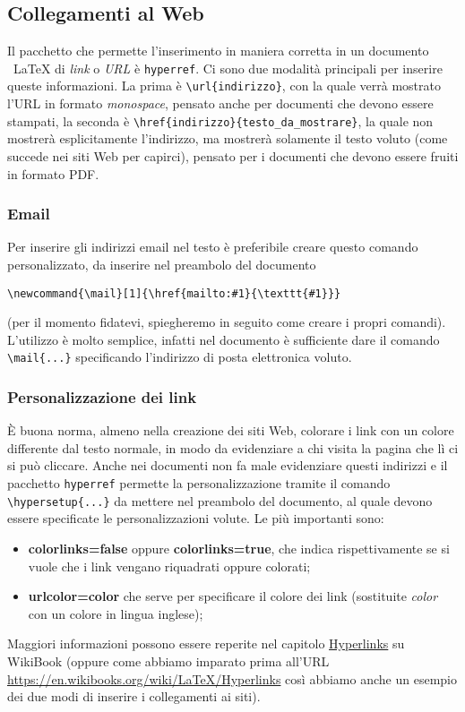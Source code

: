 \subsection{Collegamenti al Web}
Il pacchetto che permette l'inserimento in maniera corretta in un documento \
LaTeX{} di \textit{link} o \textit{URL} è \verb!hyperref!. Ci sono due 
modalità principali per inserire queste informazioni. La prima è 
\verb!\url{indirizzo}!, con la quale verrà mostrato l'URL in formato \textit{
monospace}, pensato anche per documenti che devono essere stampati, la seconda 
è \verb!\href{indirizzo}{testo_da_mostrare}!, la quale non mostrerà 
esplicitamente l'indirizzo, ma mostrerà solamente il testo voluto (come 
succede nei siti Web per capirci), pensato per i documenti che devono 
essere fruiti in formato PDF. 

\subsubsection{Email}\label{subsec:email}
Per inserire gli indirizzi email nel testo è preferibile creare questo comando 
personalizzato, da inserire nel preambolo del documento
\begin{lstlisting}
\newcommand{\mail}[1]{\href{mailto:#1}{\texttt{#1}}}
\end{lstlisting}
(per il momento fidatevi, spiegheremo in seguito come creare i propri 
comandi). L'utilizzo è molto semplice, infatti nel documento è sufficiente 
dare il comando \verb!\mail{...}! specificando l'indirizzo di posta 
elettronica voluto.

\subsubsection{Personalizzazione dei link}
È buona norma, almeno nella creazione dei siti Web, colorare i link con un 
colore differente dal testo normale, in modo da evidenziare a chi visita la 
pagina che lì ci si può cliccare. Anche nei documenti non fa male evidenziare 
questi indirizzi e il pacchetto \verb!hyperref! permette la personalizzazione 
tramite il comando \verb!\hypersetup{...}! da mettere nel preambolo del 
documento, al quale devono essere specificate le personalizzazioni volute. Le 
più importanti sono:
\begin{itemize}
    \item \textbf{colorlinks=false} oppure \textbf{colorlinks=true}, che 
    indica rispettivamente se si vuole che i link vengano riquadrati oppure 
    colorati;
    \item \textbf{urlcolor=color} che serve per specificare il colore dei link 
    (sostituite \textit{color} con un colore in lingua inglese);
\end{itemize}
Maggiori informazioni possono essere reperite nel capitolo 
\href{https://en.wikibooks.org/wiki/LaTeX/Hyperlinks}{Hyperlinks} su WikiBook 
(oppure come abbiamo imparato prima all'URL 
\url{https://en.wikibooks.org/wiki/LaTeX/Hyperlinks} così abbiamo anche un 
esempio dei due modi di inserire i collegamenti ai siti).
